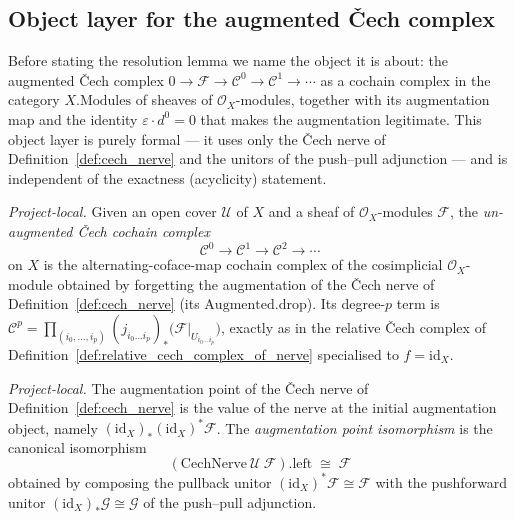 \subsection{Object layer for the augmented {\v C}ech complex}

Before stating the resolution lemma we name the object it is about: the augmented {\v C}ech complex
\(0 \to \mathcal{F} \to \mathcal{C}^0 \to \mathcal{C}^1 \to \cdots\) as a cochain complex in the
category \(X.\mathrm{Modules}\) of sheaves of \(\mathcal{O}_X\)-modules, together with its augmentation
map and the identity \(\varepsilon \cdot d^0 = 0\) that makes the augmentation legitimate. This object
layer is purely formal --- it uses only the {\v C}ech nerve of Definition~\ref{def:cech_nerve} and the
unitors of the push--pull adjunction --- and is independent of the exactness (acyclicity) statement.

\begin{definition}\leanok
  \label{def:cech_complex_on_X}
  \textit{Project-local.}
  Given an open cover \(\mathcal{U}\) of \(X\) and a sheaf of \(\mathcal{O}_X\)-modules \(\mathcal{F}\),
  the \emph{un-augmented {\v C}ech cochain complex}
  \[
    \mathcal{C}^0 \to \mathcal{C}^1 \to \mathcal{C}^2 \to \cdots
  \]
  on \(X\) is the alternating-coface-map cochain complex of the cosimplicial \(\mathcal{O}_X\)-module
  obtained by forgetting the augmentation of the {\v C}ech nerve of Definition~\ref{def:cech_nerve}
  (its \(\mathrm{Augmented.drop}\)). Its degree-\(p\) term is \(\mathcal{C}^p =
  \prod_{(i_0, \ldots, i_p)} (j_{i_0 \ldots i_p})_*\bigl(\mathcal{F}|_{U_{i_0 \ldots i_p}}\bigr)\),
  exactly as in the relative {\v C}ech complex of
  Definition~\ref{def:relative_cech_complex_of_nerve} specialised to \(f = \mathrm{id}_X\).
\end{definition}

\begin{definition}\leanok
  \label{def:cech_nerve_point_iso}
  \textit{Project-local.}
  The augmentation point of the {\v C}ech nerve of Definition~\ref{def:cech_nerve} is the value of the
  nerve at the initial augmentation object, namely \((\mathrm{id}_X)_* (\mathrm{id}_X)^* \mathcal{F}\).
  The \emph{augmentation point isomorphism} is the canonical isomorphism
  \[
    (\mathrm{CechNerve}\ \mathcal{U}\ \mathcal{F}).\mathrm{left} \;\cong\; \mathcal{F}
  \]
  obtained by composing the pullback unitor \((\mathrm{id}_X)^* \mathcal{F} \cong \mathcal{F}\) with the
  pushforward unitor \((\mathrm{id}_X)_* \mathcal{G} \cong \mathcal{G}\) of the push--pull adjunction.
\end{definition}

